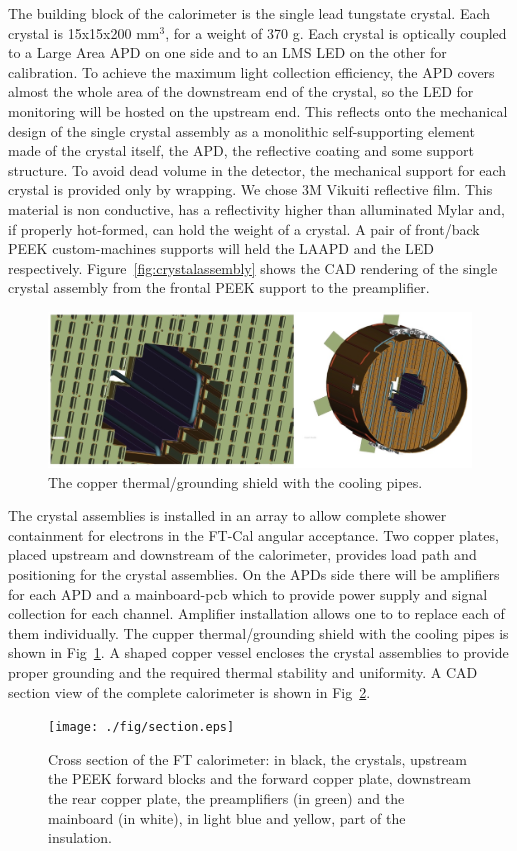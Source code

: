 The building block of the calorimeter is the
single lead tungstate crystal. Each crystal
is 15x15x200 mm$^3$, for a weight of
370 g.
Each crystal is optically coupled
to a Large Area APD on one side  and to an LMS LED on the other for calibration. To achieve the maximum
light collection efficiency, the APD covers
almost the whole area of the downstream
end of the crystal, so the LED for monitoring
will be hosted on the upstream end. This
reflects onto the mechanical design of the single
crystal assembly 
as a monolithic self-supporting element made of
the crystal itself, the APD, the reflective coating
 and some support structure.
To avoid dead volume in the detector,
the mechanical support for each crystal is provided only by wrapping. We chose 3M Vikuiti reflective film. This material is non conductive, has a reflectivity higher
than alluminated Mylar and, if properly
hot-formed, can hold the weight of a crystal. A pair of front/back PEEK custom-machines supports will held the LAAPD and the LED respectively. Figure~\ref{fig:crystalassembly} shows the CAD rendering of the single
crystal assembly from the frontal PEEK support
to the  preamplifier.
\begin{figure}[th!]
\centering 
\includegraphics[width=1.0\columnwidth]{./fig/raff.jpeg}
\caption{The copper thermal/grounding shield
with the cooling pipes.}
\label{fig:piping} 
\end{figure}

The crystal assemblies is installed in an
array to allow complete shower containment
for electrons in the FT-Cal angular acceptance.
Two copper plates, placed upstream and downstream
of the calorimeter, provides load path
and positioning for the crystal assemblies. On
the APDs side there will be amplifiers for
each APD and a mainboard-pcb which to provide
power supply and signal collection for
each channel. Amplifier installation allows one to 
to replace each of them  individually. The cupper
thermal/grounding shield with the cooling
pipes is shown in Fig~\ref{fig:piping}. A shaped copper
vessel encloses the crystal assemblies to provide proper grounding and the required
thermal stability and uniformity. A CAD section
view of the complete calorimeter is shown in Fig~\ref{fig:calsec}.
\begin{figure}[th!]
\centering 
\texttt{[image: ./fig/section.eps]}
\caption{Cross section of the FT calorimeter: in black, the crystals, upstream the PEEK forward blocks and the forward copper plate, downstream the rear copper plate, the preamplifiers (in green) and the mainboard (in white), in light blue and yellow, part of the insulation.}
\label{fig:calsec} 
\end{figure}


